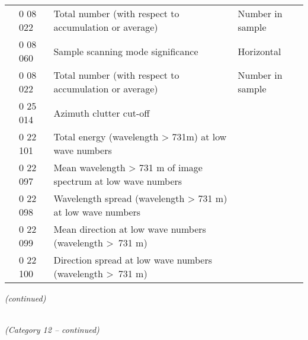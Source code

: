 \begin{longtable}[]{@{}llll@{}}
& 0 08 022 & Total number (with respect to accumulation or average) & Number in sample\tabularnewline
& 0 08 060 & Sample scanning mode significance & Horizontal\tabularnewline
& 0 08 022 & Total number (with respect to accumulation or average) & Number in sample\tabularnewline
& 0 25 014 & Azimuth clutter cut-off &\tabularnewline
& 0 22 101 & Total energy (wavelength \textgreater{} 731m) at low wave numbers &\tabularnewline
& 0 22 097 & Mean wavelength \textgreater{} 731 m of image spectrum at low wave numbers &\tabularnewline
& 0 22 098 & Wavelength spread (wavelength \textgreater{} 731 m) at low wave numbers &\tabularnewline
& 0 22 099 & Mean direction at low wave numbers (wavelength \textgreater~731 m) &\tabularnewline
& 0 22 100 & Direction spread at low wave numbers (wavelength \textgreater~731 m) &\tabularnewline
\bottomrule
\end{longtable}

\emph{(continued)}

\emph{\\
(Category 12 -- continued)}


